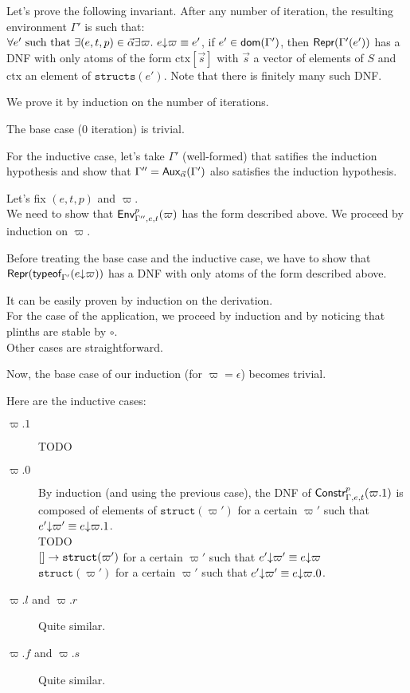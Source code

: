 \documentclass[a4paper]{article}
\theoremstyle{definition}
\begin{document}
    Let's prove the following invariant. After any number of iteration, the resulting environment $\Gamma'$ is such that:\\
    $\forall e' \text{ such that } \exists (e,t,p) \in \tenv \exists \varpi.\ \occ e \varpi \equiv e'$,
    if $e' \in \dom {\Gamma'}$, then $\tsrep {\Gamma'(e')}$ has a DNF with only atoms of the form
    $\text{ctx}[\vec s]$ with $\vec s$ a vector of elements of $S$ and $\text{ctx}$ an element of $\texttt{structs}(e')$.
    Note that there is finitely many such DNF.
        
    We prove it by induction on the number of iterations.

    The base case (0 iteration) is trivial.

    For the inductive case, let's take $\Gamma'$ (well-formed) that satifies the induction hypothesis
    and show that $\Gamma'' = \Gaux \tenv {\Gamma'}$ also satisfies the induction hypothesis.

    Let's fix $(e,t,p)$ and $\varpi$.\\
    We need to show that $\Gp p {\Gamma'',e,t} (\varpi)$ has the form described above.    
    We proceed by induction on $\varpi$.

    Before treating the base case and the inductive case, we have to show that $\tsrep {\tyof {\occ e \varpi} {\Gamma'}}$
    has a DNF with only atoms of the form described above.

    It can be easily proven by induction on the derivation.\\
    For the case of the application, we proceed by induction and by noticing that plinths are stable by $\circ$.\\
    Other cases are straightforward.

    Now, the base case of our induction (for $\varpi=\epsilon$) becomes trivial.

    Here are the inductive cases:
    \begin{description}
      \item[$\varpi.1$] TODO %
      \item[$\varpi.0$] By induction (and using the previous case), the DNF of $\typep{p}{\varpi.1}{\Gamma,e,t}$ is composed of elements of
      $\texttt{struct}(\varpi')$ for a certain $\varpi'$ such that $\occ {e'} {\varpi'}\equiv \occ {e} {\varpi.1}$.\\
      TODO\\
      $\arrow {[]} {\texttt{struct}(\varpi')}$ for a certain $\varpi'$ such that $\occ {e'} {\varpi'}\equiv \occ {e} {\varpi}$\\
      $\texttt{struct}(\varpi')$ for a certain $\varpi'$ such that $\occ {e'} {\varpi'}\equiv \occ {e} {\varpi.0}$.
      \item[$\varpi.l$ and $\varpi.r$] Quite similar.
      \item[$\varpi.f$ and $\varpi.s$] Quite similar.
    \end{description}
\end{document}
